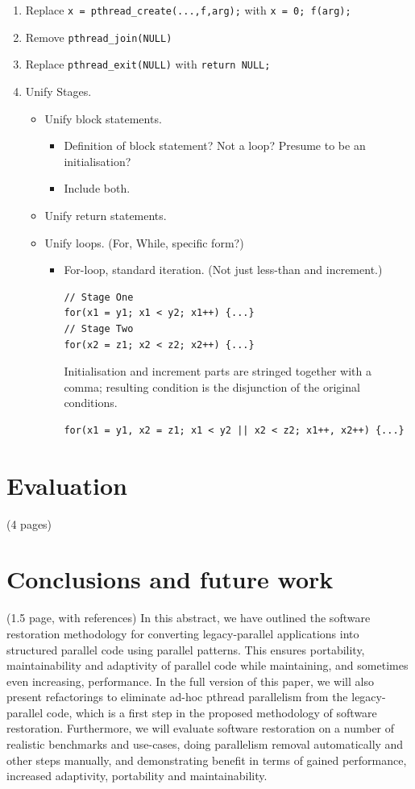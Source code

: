 \documentclass{llncs}
\begin{document}
\begin{enumerate}
\item Replace \lstinline|x = pthread_create(...,f,arg);| with \lstinline|x = 0; f(arg);|
\item Remove \lstinline|pthread_join(NULL)|
\item Replace \lstinline|pthread_exit(NULL)| with \lstinline|return NULL;|
\item Unify Stages.
  \begin{itemize}
  \item Unify block statements.
    \begin{itemize}
    \item Definition of block statement? Not a loop? Presume to be an initialisation?
    \item Include both. 
    \end{itemize}
  \item Unify return statements.
  \item Unify loops. (For, While, specific form?)
    \begin{itemize}
    \item For-loop, standard iteration. (Not just less-than and increment.)
    \begin{lstlisting}[frame=single]
// Stage One
for(x1 = y1; x1 < y2; x1++) {...}
// Stage Two
for(x2 = z1; x2 < z2; x2++) {...}
    \end{lstlisting}
    Initialisation and increment parts are stringed together with a comma; resulting condition is the disjunction of the original conditions.
    \begin{lstlisting}[frame=single]
for(x1 = y1, x2 = z1; x1 < y2 || x2 < z2; x1++, x2++) {...}
    \end{lstlisting}
    \end{itemize}
  \end{itemize}
\end{enumerate}


\section{Evaluation} (4 pages)

\section{Conclusions and future work} \label{sec:Conclusions} (1.5 page, with references)
In this abstract, we have outlined the software restoration methodology for converting legacy-parallel applications into structured parallel code using parallel patterns. This ensures portability, maintainability and adaptivity of parallel code while maintaining, and sometimes even increasing, performance. In the full version of this paper, we will also present refactorings to eliminate ad-hoc pthread parallelism from the legacy-parallel code, which is a first step in the proposed methodology of software restoration. Furthermore, we will evaluate software restoration on a number of realistic benchmarks and use-cases, doing parallelism removal automatically and other steps manually, and demonstrating benefit in terms of gained performance, increased adaptivity, portability and maintainability.
\end{document}
